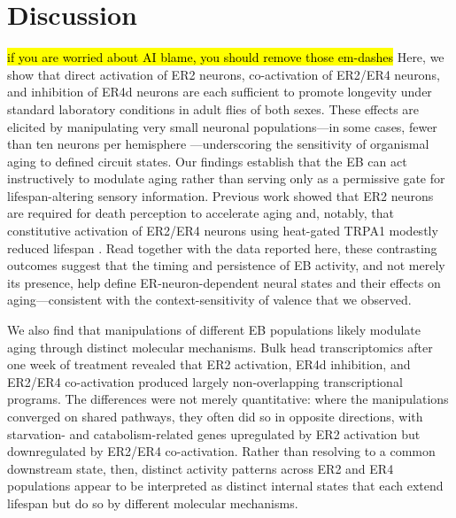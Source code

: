 \section*{Discussion}
\hl{if you are worried about AI blame, you should remove those em-dashes}
Here, we show that direct activation of ER2 neurons, co-activation of ER2/ER4 neurons, and inhibition of ER4d neurons are each sufficient to promote longevity under standard laboratory conditions in adult flies of both sexes.
These effects are elicited by manipulating very small neuronal populations---in some cases, fewer than ten neurons per hemisphere \citep{omoto2018}---underscoring the sensitivity of organismal aging to defined circuit states.
Our findings establish that the EB can act instructively to modulate aging rather than serving only as a permissive gate for lifespan-altering sensory information.
Previous work showed that ER2 neurons are required for death perception to accelerate aging \citep{gendron2023} and, notably, that constitutive activation of ER2/ER4 neurons using heat-gated TRPA1 modestly reduced lifespan \citep{gendron2023}.
Read together with the data reported here, these contrasting outcomes suggest that the timing and persistence of EB activity, and not merely its presence, help define ER-neuron-dependent neural states and their effects on aging---consistent with the context-sensitivity of valence that we observed.

We also find that manipulations of different EB populations likely modulate aging through distinct molecular mechanisms.
Bulk head transcriptomics after one week of treatment revealed that ER2 activation, ER4d inhibition, and ER2/ER4 co-activation produced largely non-overlapping transcriptional programs.
The differences were not merely quantitative: where the manipulations converged on shared pathways, they often did so in opposite directions, with starvation- and catabolism-related genes upregulated by ER2 activation but downregulated by ER2/ER4 co-activation.
Rather than resolving to a common downstream state, then, distinct activity patterns across ER2 and ER4 populations appear to be interpreted as distinct internal states that each extend lifespan but do so by different molecular mechanisms.

